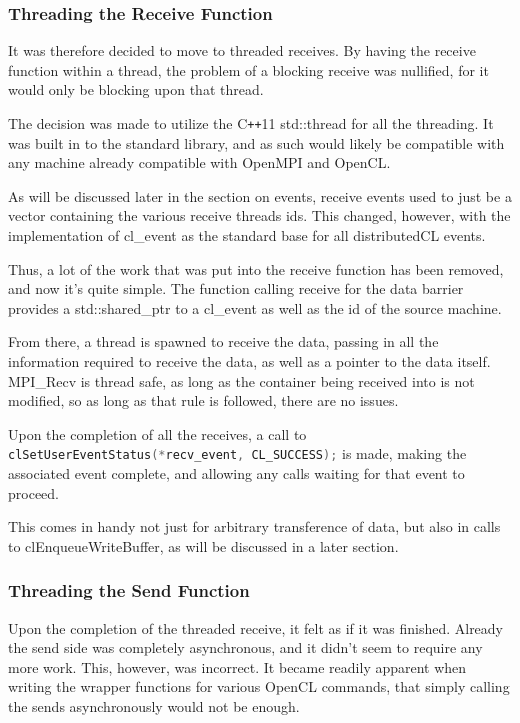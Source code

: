 \documentclass[../thesis.tex]{subfiles}
\begin{document}

  \subsubsection{Threading the Receive Function} %
  \label{ssub:threading_the_receive_function}
      
    It was therefore decided to move to threaded receives. By having the receive function within a thread, the problem of a blocking receive was nullified, for it would only be blocking upon that thread.

    The decision was made to utilize the C\texttt{++}11 std::thread for all the threading. It was built in to the standard library, and as such would likely be compatible with any machine already compatible with OpenMPI and OpenCL.

    As will be discussed later in the section on events, receive events used to just be a vector containing the various receive threads ids. This changed, however, with the implementation of cl\_event as the standard base for all distributedCL events.

    Thus, a lot of the work that was put into the receive function has been removed, and now it's quite simple. The function calling receive for the data barrier provides a std::shared\_ptr to a cl\_event as well as the id of the source machine.

    From there, a thread is spawned to receive the data, passing in all the information required to receive the data, as well as a pointer to the data itself. MPI\_Recv is thread safe, as long as the container being received into is not modified, so as long as that rule is followed, there are no issues.

    Upon the completion of all the receives, a call to \lstinline[language=cpp]{clSetUserEventStatus(*recv_event, CL_SUCCESS);} is made, making the associated event complete, and allowing any calls waiting for that event to proceed.

    This comes in handy not just for arbitrary transference of data, but also in calls to clEnqueueWriteBuffer, as will be discussed in a later section.


  \subsubsection{Threading the Send Function} %
  \label{ssub:threading_the_send_function}
    Upon the completion of the threaded receive, it felt as if it was finished. Already the send side was completely asynchronous, and it didn't seem to require any more work. This, however, was incorrect. It became readily apparent when writing the wrapper functions for various OpenCL commands, that simply calling the sends asynchronously would not be enough.
\end{document}
